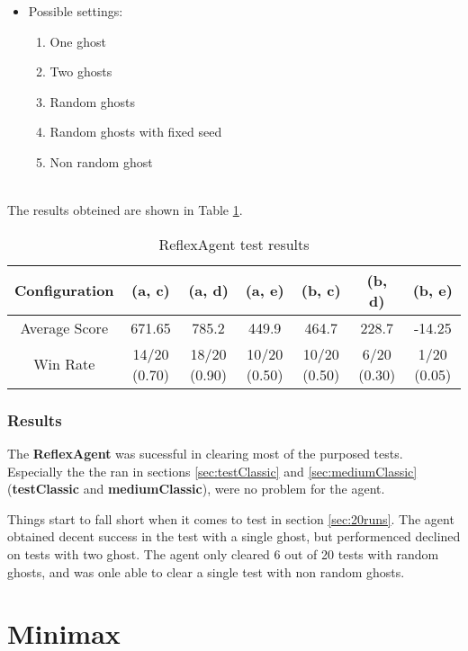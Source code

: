 \documentclass{article}
\begin{document}
\begin{itemize}
  \item Possible settings:
  \begin{enumerate}[label=(\alph*)]
    \item One ghost
    \item Two ghosts
    \item Random ghosts
    \item Random ghosts with fixed seed
    \item Non random ghost
  \end{enumerate}
\end{itemize}

~\\
The results obteined are shown in Table \ref{tab:reflexagent}.

\begin{table}[!ht]
  \begin{center}
  \begin{tabular}{||c||c|c|c|c|c|c||}
  \hline
  Configuration & (a, c) & (a, d) & (a, e) & (b, c) & (b, d) & (b, e) \\
  \hline\hline
  Average Score & 671.65 & 785.2 & 449.9 & 464.7 & 228.7 & -14.25 \\
  \hline\hline
  Win Rate & 14/20 (0.70) & 18/20 (0.90) & 10/20 (0.50) & 10/20 (0.50) & 6/20 (0.30) & 1/20 (0.05) \\
  \hline
  \end{tabular}
  \caption{ReflexAgent test results}
  \label{tab:reflexagent}
  \end{center}
\end{table}

\subsubsection{Results}
The \textbf{ReflexAgent} was sucessful in clearing most of the purposed tests. Especially the the ran in sections \ref{sec:testClassic} and \ref{sec:mediumClassic} (\textbf{testClassic} and \textbf{mediumClassic}), were no problem for the agent.

Things start to fall short when it comes to test in section \ref{sec:20runs}. The agent obtained decent success in the test with a single ghost, but performenced declined on tests with two ghost. The agent only cleared 6 out of 20 tests with random ghosts, and was onle able to clear a single test with non random ghosts.

\hfill\break
\pagebreak
\section{Minimax}
\end{document}
